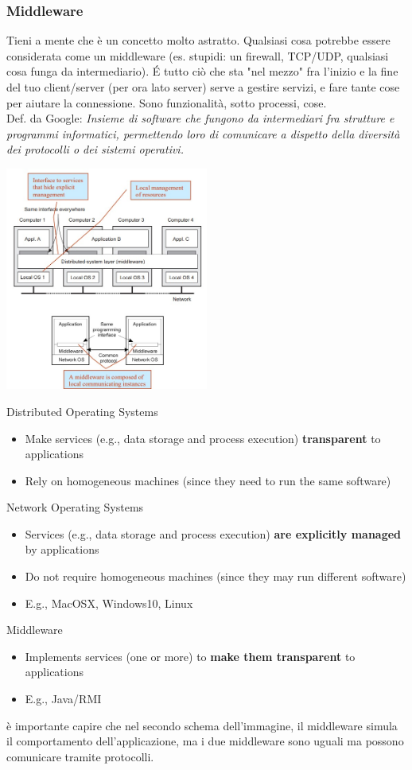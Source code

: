 \subsubsection{Middleware}
    Tieni a mente che è un concetto molto astratto. Qualsiasi cosa potrebbe essere considerata come un middleware (es. stupidi: un firewall, TCP/UDP, qualsiasi cosa funga da intermediario). \'E tutto ciò che sta "nel mezzo" fra l'inizio e la fine del tuo client/server (per ora lato server) serve a gestire servizi, e fare tante cose per aiutare la connessione. Sono funzionalità, sotto processi, cose.
    \\Def. da Google: \textit{Insieme di software che fungono da intermediari fra strutture e programmi informatici, permettendo loro di comunicare a dispetto della diversità dei protocolli o dei sistemi operativi.}
    \begin{center}
        \includegraphics[width=0.5\textwidth]{img/Middleware1.jpg}
    \end{center}
    Distributed Operating Systems
    \begin{itemize}
        \item Make services (e.g., data storage and process execution) \textbf{transparent} to applications
        \item Rely on homogeneous machines (since they need to run the same software)
    \end{itemize}
    Network Operating Systems
    \begin{itemize}
        \item Services (e.g., data storage and process execution) \textbf{are explicitly managed} by applications
        \item Do not require homogeneous machines (since they may run different software)
        \item E.g., MacOSX, Windows10, Linux
    \end{itemize}
    Middleware
    \begin{itemize}
        \item Implements services (one or more) to \textbf{make them transparent} to applications
        \item E.g., Java/RMI
    \end{itemize}
    è importante capire che nel secondo schema dell'immagine, il middleware simula il comportamento dell'applicazione, ma i due middleware sono uguali ma possono comunicare tramite protocolli.

